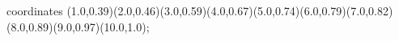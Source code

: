 					coordinates { (1.0,0.39)(2.0,0.46)(3.0,0.59)(4.0,0.67)(5.0,0.74)(6.0,0.79)(7.0,0.82)(8.0,0.89)(9.0,0.97)(10.0,1.0)};